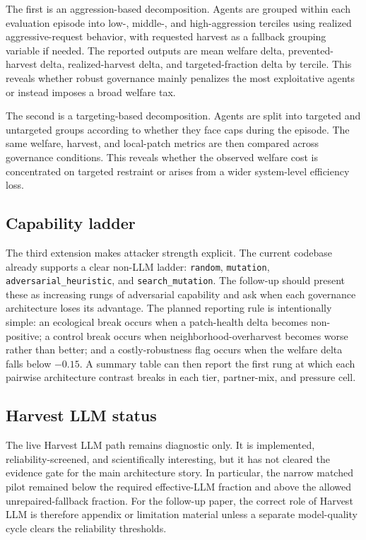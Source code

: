 The first is an aggression-based decomposition. Agents are grouped within each evaluation episode into low-, middle-, and high-aggression terciles using realized aggressive-request behavior, with requested harvest as a fallback grouping variable if needed. The reported outputs are mean welfare delta, prevented-harvest delta, realized-harvest delta, and targeted-fraction delta by tercile. This reveals whether robust governance mainly penalizes the most exploitative agents or instead imposes a broad welfare tax.

The second is a targeting-based decomposition. Agents are split into targeted and untargeted groups according to whether they face caps during the episode. The same welfare, harvest, and local-patch metrics are then compared across governance conditions. This reveals whether the observed welfare cost is concentrated on targeted restraint or arises from a wider system-level efficiency loss.

\subsection{Capability ladder}

The third extension makes attacker strength explicit. The current codebase already supports a clear non-LLM ladder: \texttt{random}, \texttt{mutation}, \texttt{adversarial\_heuristic}, and \texttt{search\_mutation}. The follow-up should present these as increasing rungs of adversarial capability and ask when each governance architecture loses its advantage. The planned reporting rule is intentionally simple: an ecological break occurs when a patch-health delta becomes non-positive; a control break occurs when neighborhood-overharvest becomes worse rather than better; and a costly-robustness flag occurs when the welfare delta falls below \(-0.15\). A summary table can then report the first rung at which each pairwise architecture contrast breaks in each tier, partner-mix, and pressure cell.

\subsection{Harvest LLM status}

The live Harvest LLM path remains diagnostic only. It is implemented, reliability-screened, and scientifically interesting, but it has not cleared the evidence gate for the main architecture story. In particular, the narrow matched pilot remained below the required effective-LLM fraction and above the allowed unrepaired-fallback fraction. For the follow-up paper, the correct role of Harvest LLM is therefore appendix or limitation material unless a separate model-quality cycle clears the reliability thresholds.
